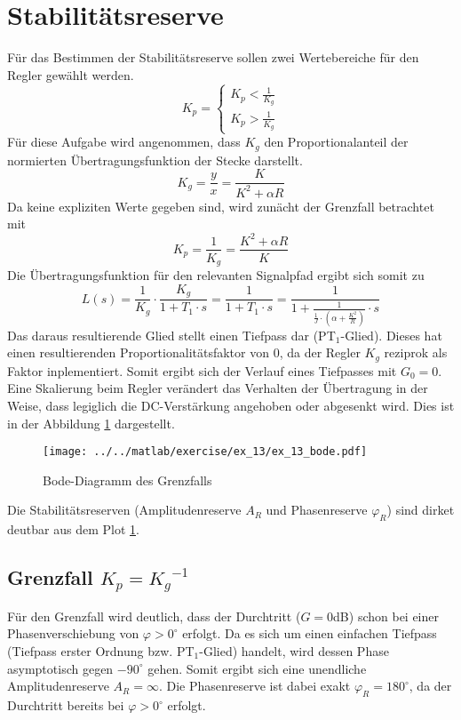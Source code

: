 \section{Stabilitätsreserve}
Für das Bestimmen der Stabilitätsreserve sollen zwei Wertebereiche für den
Regler gewählt werden.
\[
	K_p  = \left\{
		\begin{array}{l}
			K_p < \frac{1}{K_g} \\
			K_p > \frac{1}{K_g}
		\end{array}
	\right.
\]
Für diese Aufgabe wird angenommen, dass $K_g$ den Proportionalanteil
der normierten Übertragungsfunktion der Stecke darstellt.
\[
	K_g = \frac{y}{x} = \frac{K}{K^2 + \alpha R}
\]
Da keine expliziten Werte gegeben sind, wird zunächt der Grenzfall
betrachtet mit
\[
	K_p = \frac{1}{K_g} = \frac{K^2 + \alpha R}{K}
\]
Die Übertragungsfunktion für den relevanten Signalpfad ergibt sich somit zu
\[
	L(s) = \frac{1}{K_g} \cdot \frac{K_g}{1 + T_1 \cdot s}
	= \frac{1}{1 + T_1 \cdot s} 
	= \frac{1}{1 + \frac{1}{\frac{1}{J} \cdot \left(
		\alpha + \frac{K^2}{R} \right) } \cdot s }
\]
Das daraus resultierende Glied stellt einen Tiefpass dar (PT$_1$-Glied).
Dieses hat einen resultierenden Proportionalitätsfaktor von 0, da der 
Regler $K_g$ reziprok als Faktor inplementiert. Somit ergibt sich der
Verlauf eines Tiefpasses mit $G_0 = 0$. Eine Skalierung beim Regler
verändert das Verhalten der Übertragung in der Weise, dass legiglich die
DC-Verstärkung angehoben oder abgesenkt wird. Dies ist in der Abbildung
\ref{fig:ex_13_bode} dargestellt.
\begin{figure}[h!]
	\centering
	\texttt{[image: ../../matlab/exercise/ex\_13/ex\_13\_bode.pdf]}
	\caption{Bode-Diagramm des Grenzfalls}
	\label{fig:ex_13_bode}
\end{figure}
Die Stabilitätsreserven (Amplitudenreserve $A_R$ und Phasenreserve
$\varphi_R$) sind dirket deutbar aus dem Plot \ref{fig:ex_13_bode}.

\subsection{Grenzfall $K_p = {K_g}^{-1}$}
Für den Grenzfall wird deutlich, dass der Durchtritt ($G = 0$dB) schon
bei einer Phasenverschiebung von $\varphi > 0^{\circ}$ erfolgt.
Da es sich um einen einfachen Tiefpass (Tiefpass erster Ordnung bzw.
PT$_1$-Glied) handelt, wird dessen Phase
asymptotisch gegen $-90^{\circ}$ gehen. Somit ergibt sich eine unendliche
Amplitudenreserve $A_R = \infty$. Die Phasenreserve ist dabei exakt
$\varphi_R = 180^{\circ}$, da der Durchtritt bereits bei
$\varphi > 0^{\circ}$ erfolgt.

